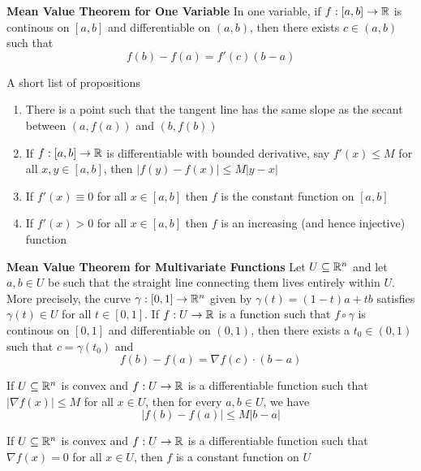 \documentclass[11pt]{article}
\begin{document}
\begin{theorem}
  \label{One variable Mean Value Theorem}
  \textbf{Mean Value Theorem for One Variable}
  In one variable, if $f: [a,b]\rightarrow \mathbb{R}$ is continous on $[a,b]$ and differentiable on $(a,b)$, then there exists $c\in (a,b)$ such that
  \[
    f(b) - f(a) = f'(c)(b-a)
  \]
  \begin{corollary}
    A short list of propositions \\
    \begin{enumerate}
      \item There is a point such that the tangent line has the same slope as the secant between $(a, f(a))$ and $(b, f(b))$
      \item If $f: [a,b]\rightarrow \mathbb{R}$ is differentiable with bounded derivative, say $f'(x) \leq M$ for all $x,y\in [a,b]$, then $|f(y) - f(x)| \leq M |y-x|$
      \item If $f'(x) \equiv 0$ for all $x\in[a,b]$ then $f$ is the constant function on $[a,b]$
      \item If $f'(x) > 0$ for all $x\in[a,b]$ then $f$ is an increasing (and hence injective) function
    \end{enumerate}
  \end{corollary}
\end{theorem}


\begin{theorem}
  \label{multivariate Mean Value Theorem}
  \textbf{Mean Value Theorem for Multivariate Functions}
  Let $U\subseteq \mathbb{R}^n$ and let $a,b\in U$ be such that the straight line connecting them lives entirely within $U$. More precisely, the curve $\gamma: [0,1]\rightarrow \mathbb{R}^n$ given by $\gamma(t) = (1-t)a + tb$ satisfies $\gamma(t)\in U$ for all $t\in [0,1]$. If $f: U\rightarrow \mathbb{R}$ is a function such that $f\circ \gamma$ is continous on $[0,1]$ and differentiable on $(0,1)$, then there exists a $t_0\in (0,1)$ such that $c=\gamma(t_0)$ and
  \[
    f(b) - f(a) = \nabla f(c) \cdot (b-a)
  \]
  \begin{corollary}
    If $U\subseteq \mathbb{R}^n$ is convex and $f:U\rightarrow \mathbb{R}$ is a differentiable function such that $|\nabla f(x)| \leq M$ for all $x\in U$, then for every $a,b\in U$, we have
    \[
      |f(b) - f(a)| \leq M |b-a|
    \]
  \end{corollary}

  \begin{corollary}
    If $U\subseteq \mathbb{R}^n$ is convex and $f: U\rightarrow \mathbb{R}$ is a differentiable function such that $\nabla f(x) = 0$ for all $x\in U$, then $f$ is a constant function on $U$
  \end{corollary}
\end{theorem}
\end{document}
